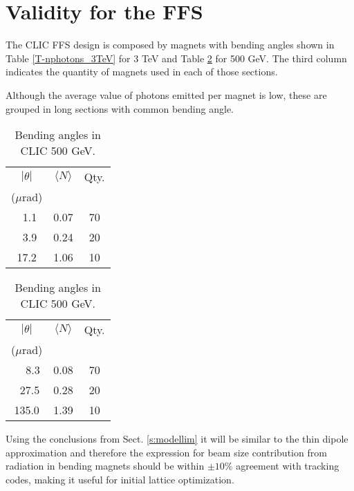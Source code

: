 \section{Validity for the FFS}
The CLIC FFS design is composed by magnets with bending angles shown in Table \ref{T-nphotons_3TeV} for 3 TeV and Table \ref{T-nphotons_500GeV} for 500 GeV.  The third column indicates the quantity of magnets used in each of those sections.\par 
Although the average value of photons emitted per magnet is low, these are grouped in long sections with common bending angle. \begin{table}[ht]
\begin{minipage}[b]{0.45\linewidth}\centering
\begin{tabular}{c|c|c}\hline\hline
 $|\theta|$ & $\langle N \rangle$&Qty.\\
 ($\mu$rad)&&\\\hline
 $\;\;$1.1& 0.07 &70 \\
 $\;\;$3.9& 0.24 &20 \\
 17.2& 1.06 &10\\\hline
\end{tabular}\caption{Bending angles in CLIC 3 TeV.}\label{T-nphotons_3TeV}
\end{minipage}
\hspace{0.5cm}
\begin{minipage}[b]{0.45\linewidth}
\centering
\begin{tabular}{c|c|c}\hline\hline
 $|\theta|$& $\langle N \rangle$&Qty.\\
 ($\mu$rad)&&\\\hline
 $\;\;\;\;$8.3& 0.08&70\\
 $\;\;$27.5& 0.28 &20\\
 135.0& 1.39 &10\\\hline
\end{tabular}\caption{Bending angles in CLIC 500 GeV.}\label{T-nphotons_500GeV}
\end{minipage}
\end{table}
Using the conclusions from Sect. \ref{s:modellim} it will be similar to the thin dipole approximation and therefore the expression for beam size contribution from radiation in bending magnets should be within $\pm10\%$ agreement with tracking codes, making it useful for initial lattice optimization.\par
